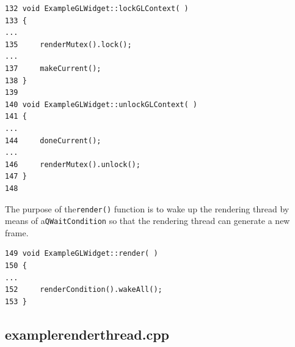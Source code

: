 \documentclass[prodmode,acmtopc]{acmsmall}
\begin{document}
\begin{lstlisting}
132 void ExampleGLWidget::lockGLContext( )
133 {
...
135     renderMutex().lock();
...
137     makeCurrent();
138 }
139
140 void ExampleGLWidget::unlockGLContext( )
141 {
...
144     doneCurrent();
...
146     renderMutex().unlock();
147 }
148
\end{lstlisting}
%
The purpose of the\lstinline|render()| function is to wake up the rendering thread by means of a\lstinline|QWaitCondition| so that the rendering thread can generate a new frame.
%
\begin{lstlisting}
149 void ExampleGLWidget::render( )
150 {
...
152     renderCondition().wakeAll();
153 }
\end{lstlisting}

\subsection{examplerenderthread.cpp}
\end{document}
